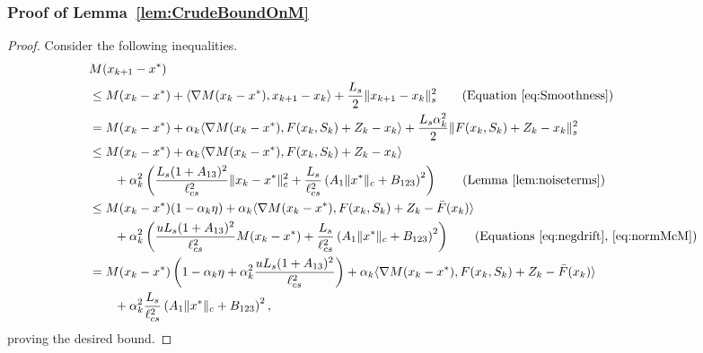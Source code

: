 \documentclass{article}
\newcommand{\lrp}[1]{\left( #1 \right)}
\newcommand{\lcs}{\ell_{cs}}
\newcommand{\xkp}{x_{k+1}}
\newcommand{\xk}{x_k}
\begin{document}
\subsubsection{Proof of Lemma~\ref{lem:CrudeBoundOnM}}\label{app:proof_lem:CrudeBoundOnM}
\begin{proof}
Consider the following inequalities. 
\begin{align*}
    & M(\xkp - x^*) \\
    &\le M(\xk - x^*) + \langle \nabla M(\xk - x^*), \xkp - \xk \rangle + \frac{L_s}{2} \|\xkp - \xk\|^2_s \tag{Equation~\eqref{eq:Smoothness}}\\
    &= M(\xk - x^*) + \alpha_k \langle \nabla M(\xk - x^*), F(\xk, S_k) + Z_k - \xk \rangle + \frac{L_s \alpha^2_k}{2} \|F(\xk,S_k) + Z_k - \xk\|^2_s\\
    &\le M(\xk - x^*) + \alpha_k \langle \nabla M(\xk - x^*), F(\xk, S_k) + Z_k - \xk \rangle \\
        &\qquad +\alpha^2_k \lrp{\frac{L_s (1+A_{13})^2}{\lcs^2} \|\xk - x^*\|^2_c + \frac{L_s}{\lcs^2} \lrp{A_{1} \|x^*\|_c  + B_{123}}^2} \tag{Lemma~\ref{lem:noiseterms}}\\
    &\le M(\xk - x^*) (1-\alpha_k \eta) + \alpha_k \langle \nabla M(\xk - x^*), F(\xk, S_k) + Z_k - \bar{F}(x_k) \rangle \\
        &\qquad +\alpha^2_k \lrp{\frac{u L_s (1+A_{13})^2}{\lcs^2} M(\xk - x^*) + \frac{L_s}{\lcs^2} \lrp{A_{1} \|x^*\|_c  + B_{123}}^2} \tag{Equations~\eqref{eq:negdrift},~\eqref{eq:normMcM}} \\
    &= M(\xk - x^*) \lrp{1-\alpha_k \eta + \alpha^2_k  \frac{uL_s (1+A_{13})^2}{\lcs^2} } + \alpha_k \langle \nabla M(\xk - x^*), F(\xk, S_k) + Z_k - \bar{F}(x_k) \rangle \\
        &\qquad + \alpha^2_k \frac{L_s }{\lcs^2} \lrp{A_{1}\|x^*\|_c + B_{123}}^2,
\end{align*}
proving the desired bound.
\end{proof}
\end{document}
